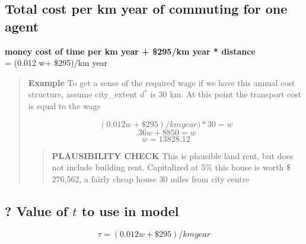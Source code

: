 \subsection{Total cost per km year of commuting for one agent}
\textbf{money cost of time per km year + \$295/km year * distance} \\
= (0.012 w+ \$295)/km year 
    \begin{quotation}
    \textbf{Example}
    To get a sense of the required wage if we have this annual cost structure, assume city\_extent $d^*$ is 30 km. At this point the transport cost is equal to the wage

\[(0.012 w+ \$295)/km year)*30 =  w\] 
\[.36w+ 8850=w\]
\[w=13828.12\]
        \begin{quotation}
        \textbf{PLAUSIBILITY CHECK}
This is plausible land rent, but does not include building rent. 
Capitalized at 5\% this house is worth \$ 276,562, a fairly cheap house 30 miles from city centre
        \end{quotation}
    \end{quotation}

{\color{red}
\subsection{? Value of $t$ to use in model}}
\[ \tau=(0.012 w+ \$295)/km year \]

